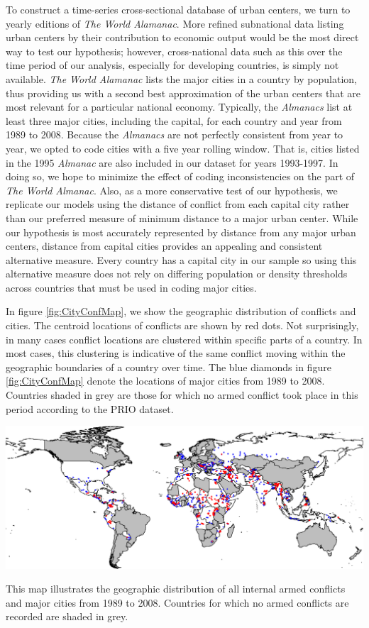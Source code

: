 To construct a time-series cross-sectional database of urban centers, we turn to yearly editions of \emph{The World Alamanac}. More refined subnational data listing urban centers by their contribution to economic output would be the most direct way to test our hypothesis; however, cross-national data such as this over the time period of our analysis, especially for developing countries, is simply not available. \emph{The World Alamanac} lists the major cities in a country by population, thus providing us with a second best approximation of the urban centers that are most relevant for a particular national economy. Typically, the \emph{Almanacs} list at least three major cities, including the capital, for each country and year from 1989 to 2008. Because the \emph{Almanacs} are not perfectly consistent from year to year, we opted to code cities with a five year rolling window. That is, cities listed in the 1995 \emph{Almanac} are also included in our dataset for years 1993-1997. In doing so, we hope to minimize the effect of coding inconsistencies on the part of \emph{The World Almanac}. Also, as a more conservative test of our hypothesis, we replicate our models using the distance of conflict from each capital city rather than our preferred measure of minimum distance to a major urban center. While our hypothesis is most accurately represented by distance from any major urban centers, distance from capital cities provides an appealing and consistent alternative measure. Every country has a capital city in our sample so using this alternative measure does not rely on differing population or density thresholds across countries that must be used in coding major cities.

In figure \ref{fig:CityConfMap}, we show the geographic distribution of conflicts and cities. The centroid locations of conflicts are shown by red dots. Not surprisingly, in many cases conflict locations are clustered within specific parts of a country. In most cases, this clustering is indicative of the same conflict moving within the geographic boundaries of a country over time. The blue diamonds in figure \ref{fig:CityConfMap} denote the locations of major cities from 1989 to 2008. Countries shaded in grey are those for which no armed conflict took place in this period according to the PRIO dataset.  

\begin{amssidewaysfigure}
	\centering
	\includegraphics[width=1\textwidth]{CityConfMap-crop}
	\caption{This map illustrates the geographic distribution of all internal armed conflicts and major cities from 1989 to 2008. Countries for which no armed conflicts are recorded are shaded in grey.}
	\label{fig:CityConfMap}
\end{amssidewaysfigure}
\FloatBarrier

